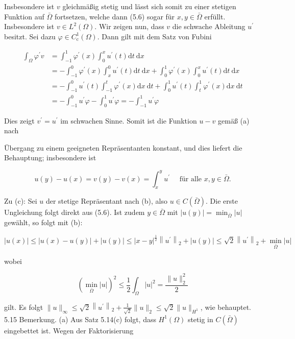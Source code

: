 \documentclass[10pt, letterpaper]{article}
\begin{document}
Insbesondere ist $v$ gleichmäßig stetig und lässt sich somit zu einer stetigen Funktion auf $\bar{\Omega}$ fortsetzen, welche dann (5.6) sogar für $x, y \in \bar{\Omega}$ erfüllt. Insbesondere ist $v \in L^{2}(\Omega)$. Wir zeigen nun, dass $v$ die schwache Ableitung $u^{\prime}$ besitzt. Sei dazu $\varphi \in C_{\mathrm{c}}^{1}(\Omega)$. Dann gilt mit dem Satz von Fubini

$$
\begin{aligned}
\int_{\Omega} \varphi^{\prime} v & =\int_{-1}^{1} \varphi^{\prime}(x) \int_{0}^{x} u^{\prime}(t) \mathrm{d} t \mathrm{~d} x \\
& =-\int_{-1}^{0} \varphi^{\prime}(x) \int_{x}^{0} u^{\prime}(t) \mathrm{d} t \mathrm{~d} x+\int_{0}^{1} \varphi^{\prime}(x) \int_{0}^{x} u^{\prime}(t) \mathrm{d} t \mathrm{~d} x \\
& =-\int_{-1}^{0} u^{\prime}(t) \int_{-1}^{t} \varphi^{\prime}(x) \mathrm{d} x \mathrm{~d} t+\int_{0}^{1} u^{\prime}(t) \int_{t}^{1} \varphi^{\prime}(x) \mathrm{d} x \mathrm{~d} t \\
& =-\int_{-1}^{0} u^{\prime} \varphi-\int_{0}^{1} u^{\prime} \varphi=-\int_{-1}^{1} u^{\prime} \varphi
\end{aligned}
$$

Dies zeigt $v^{\prime}=u^{\prime}$ im schwachen Sinne. Somit ist die Funktion $u-v$ gemäß (a) nach

Übergang zu einem geeigneten Repräsentanten konstant, und dies liefert die Behauptung; insbesondere ist

$$
u(y)-u(x)=v(y)-v(x)=\int_{x}^{y} u^{\prime} \quad \text { für alle } x, y \in \bar{\Omega} .
$$

Zu (c): Sei $u$ der stetige Repräsentant nach (b), also $u \in C(\bar{\Omega})$. Die erste Ungleichung folgt direkt aus (5.6). Ist zudem $y \in \bar{\Omega}$ mit $|u(y)|=\min _{\bar{\Omega}}|u|$ gewählt, so folgt mit (b):

$$
|u(x)| \leq|u(x)-u(y)|+|u(y)| \leq|x-y|^{\frac{1}{2}}\left\|u^{\prime}\right\|_{2}+|u(y)| \leq \sqrt{2}\left\|u^{\prime}\right\|_{2}+\min _{\bar{\Omega}}|u|
$$

wobei

$$
\left(\min _{\bar{\Omega}}|u|\right)^{2} \leq \frac{1}{2} \int_{\Omega}|u|^{2}=\frac{\|u\|_{2}^{2}}{2}
$$

gilt. Es folgt $\|u\|_{\infty} \leq \sqrt{2}\left\|u^{\prime}\right\|_{2}+\frac{1}{\sqrt{2}}\|u\|_{2} \leq \sqrt{2}\|u\|_{H^{1}}$, wie behauptet.\\
5.15 Bemerkung. (a) Aus Satz 5.14(c) folgt, dass $H^{1}(\Omega)$ stetig in $C(\bar{\Omega})$ eingebettet ist. Wegen der Faktorisierung
\end{document}
